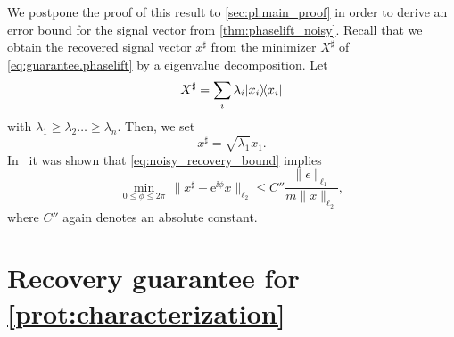 We postpone the proof of this result to \cref{sec:pl.main_proof} in order to derive an error bound for the signal vector from \cref{thm:phaselift_noisy}.
Recall that we obtain the recovered signal vector ${x}^\sharp$ from the minimizer ${X}^\sharp$ of \cref{eq:guarantee.phaselift} by a eigenvalue decomposition.
Let
\begin{equation}
  {X}^\sharp = \sum_i \lambda_i \ket{ x_i}\bra{ x_i}
\end{equation}
with $\lambda_1 \ge \lambda_2 \ldots \ge \lambda_n$.
Then, we set
\begin{equation}
  {x}^\sharp = \sqrt{\lambda_1}  x_1.
\end{equation}
In~\cite{candes_solving_2012} it was shown that \cref{eq:noisy_recovery_bound} implies
\begin{equation}
  \min_{0 \leq \phi \leq 2 \pi} \, \| {x}^\sharp - \mathrm{e}^{\ii \phi} {x} \|_{\ell_2}
  \leq C'' \frac{\| \epsilon \|_{\ell_1} }{m \| {x} \|_{\ell_2}}
, \label{eq:vectorial_noisy_bound}
\end{equation}
where $C''$ again denotes an absolute constant.

\section{Recovery guarantee for \cref{prot:characterization}}%
\label{sec:pl.guarantee}

